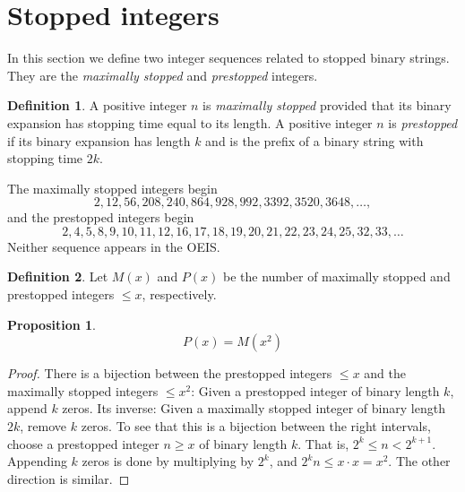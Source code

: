 \documentclass[12pt]{article}
\newtheorem{proposition}{Proposition}
\theoremstyle{definition}
\newtheorem{definition}{Definition}
\begin{document}
\section{Stopped integers}
\label{sec:integers}

In this section we define two integer sequences related to stopped binary
strings. They are the \emph{maximally stopped} and \emph{prestopped} integers.

\begin{definition}
    A positive integer $n$ is \emph{maximally stopped} provided that its binary
    expansion has stopping time equal to its length. A positive integer $n$ is
    \emph{prestopped} if its binary expansion has length $k$ and is the prefix
    of a binary string with stopping time $2k$.
\end{definition}

The maximally stopped integers begin
\begin{equation*}
    2, 12, 56, 208, 240, 864, 928, 992, 3392, 3520, 3648, \dots,
\end{equation*}
and the prestopped integers begin
\begin{equation*}
    2, 4, 5, 8, 9, 10, 11, 12, 16, 17, 18, 19, 20, 21, 22, 23, 24, 25, 32, 33, \dots
\end{equation*}
Neither sequence appears in the OEIS.

\begin{definition}
    Let $M(x)$ and $P(x)$ be the number of maximally stopped and prestopped
    integers $\leq x$, respectively.
\end{definition}

\begin{proposition}
    \begin{equation*}
        P(x) = M(x^2)
    \end{equation*}
\end{proposition}

\begin{proof}
    There is a bijection between the prestopped integers $\leq x$ and the
    maximally stopped integers $\leq x^2$: Given a prestopped integer of binary
    length $k$, append $k$ zeros. Its inverse: Given a maximally stopped
    integer of binary length $2k$, remove $k$ zeros. To see that this is a
    bijection between the right intervals, choose a prestopped integer $n \geq
    x$ of binary length $k$. That is, $2^k \leq n < 2^{k + 1}$. Appending $k$
    zeros is done by multiplying by $2^k$, and $2^k n \leq x \cdot x = x^2$.
    The other direction is similar.
\end{proof}
\end{document}
